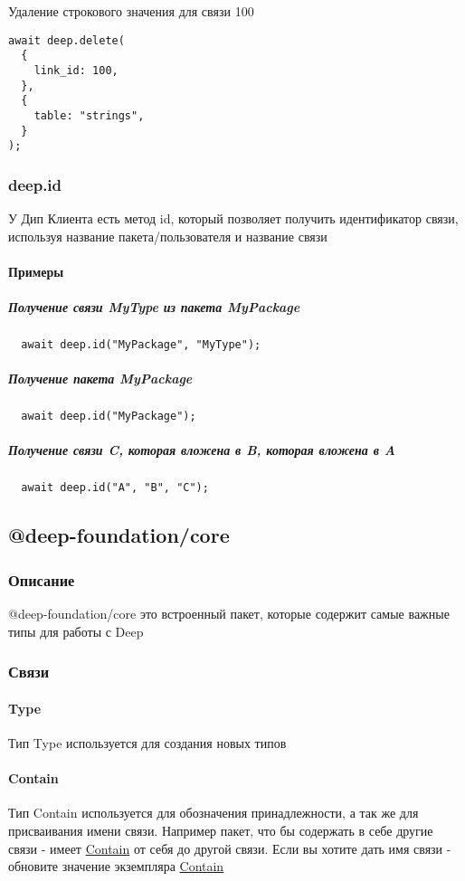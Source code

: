 \documentclass{article}
\begin{document}
Удаление строкового значения для связи 100
\begin{lstlisting}
await deep.delete(
  {
    link_id: 100,
  },
  {
    table: "strings",
  }
);
\end{lstlisting}

\subsubsection{deep.id}
У Дип Клиента есть метод id, который позволяет получить идентификатор связи, используя название пакета/пользователя и название связи
\paragraph{Примеры}
\subparagraph{Получение связи MyType из пакета MyPackage}
\begin{lstlisting}
  await deep.id("MyPackage", "MyType");
\end{lstlisting}

\subparagraph{Получение пакета MyPackage}
\begin{lstlisting}
  await deep.id("MyPackage");
\end{lstlisting}

\subparagraph{Получение связи C, которая вложена в B, которая вложена в A}
\begin{lstlisting}
  await deep.id("A", "B", "C");
\end{lstlisting}

\subsection{@deep-foundation/core}
\subsubsection{Описание}
@deep-foundation/core\hypertarget{core.Def}{} это встроенный пакет, которые
содержит самые важные типы для работы с Deep
\subsubsection{Связи}
\paragraph*{Type}
Тип Type\hypertarget{type.Def}{} используется для создания новых типов
\paragraph*{Contain}
Тип Contain\hypertarget{Contain.Def}{} используется для обозначения принадлежности, а так же для присваивания имени связи. Например пакет, что бы содержать в себе другие связи - имеет \hyperlink{Contain.Def}{Contain} от себя до другой связи. Если вы хотите дать имя связи - обновите значение экземпляра \hyperlink{Contain.Def}{Contain}
\end{document}
